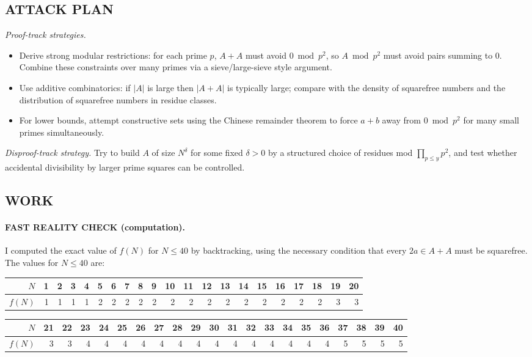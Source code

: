 \subsection*{ATTACK PLAN}
\emph{Proof-track strategies.}
\begin{itemize}
\item Derive strong modular restrictions: for each prime $p$, $A+A$ must avoid $0\bmod p^2$, so $A\bmod p^2$ must avoid pairs summing to $0$. Combine these constraints over many primes via a sieve/large-sieve style argument.
\item Use additive combinatorics: if $|A|$ is large then $|A+A|$ is typically large; compare with the density of squarefree numbers and the distribution of squarefree numbers in residue classes.
\item For lower bounds, attempt constructive sets using the Chinese remainder theorem to force $a+b$ away from $0\bmod p^2$ for many small primes simultaneously.
\end{itemize}

\emph{Disproof-track strategy.}
Try to build $A$ of size $N^{\delta}$ for some fixed $\delta>0$ by a structured choice of residues mod $\prod_{p\le y} p^2$, and test whether accidental divisibility by larger prime squares can be controlled.

\subsection*{WORK}
\paragraph{FAST REALITY CHECK (computation).}
I computed the exact value of $f(N)$ for $N\le 40$ by backtracking, using the necessary condition that every $2a\in A+A$ must be squarefree.
The values for $N\le 40$ are:

\begin{center}
\begin{tabular}{r|rrrrrrrrrrrrrrrrrrrr}
$N$ &1&2&3&4&5&6&7&8&9&10&11&12&13&14&15&16&17&18&19&20\\\hline
$f(N)$&1&1&1&1&2&2&2&2&2&2&2&2&2&2&2&2&2&2&3&3
\end{tabular}
\end{center}

\begin{center}
\begin{tabular}{r|rrrrrrrrrrrrrrrrrrrr}
$N$ &21&22&23&24&25&26&27&28&29&30&31&32&33&34&35&36&37&38&39&40\\\hline
$f(N)$&3&3&4&4&4&4&4&4&4&4&4&4&4&4&4&4&5&5&5&5
\end{tabular}
\end{center}

